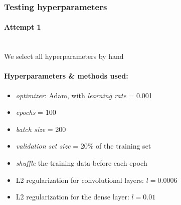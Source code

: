 \documentclass[12pt]{article}
\begin{document}
      \subsubsection{Testing hyperparameters}
        \paragraph{Attempt 1} \mbox{} \\
        We select all hyperparameters by hand
        \paragraph{Hyperparameters \& methods used:}
        \begin{itemize}
          \item \textit{optimizer}: Adam, with \textit{learning rate} = 0.001
          \item \textit{epochs} = 100
          \item \textit{batch size} = 200
          \item \textit{validation set size} = 20\% of the training set
          \item \textit{shuffle} the training data before each epoch
          \item L2 regularization for convolutional layers: $l = 0.0006$
          \item L2 regularization for the dense layer: $l = 0.01$
        \end{itemize}
\end{document}
